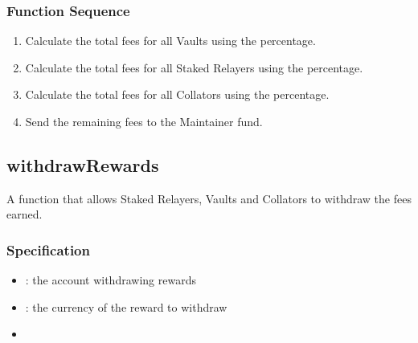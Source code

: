\documentclass[a4paper,10pt,english]{sphinxmanual}
\begin{document}


\subsubsection{Function Sequence}
\label{\detokenize{spec/fee:function-sequence}}\begin{enumerate}
%
\item {} 
Calculate the total fees for all Vaults using the  percentage.

\item {} 
Calculate the total fees for all Staked Relayers using the  percentage.

\item {} 
Calculate the total fees for all Collators using the  percentage.

\item {} 
Send the remaining fees to the Maintainer fund.

\end{enumerate}


\subsection{withdrawRewards}
\label{\detokenize{spec/fee:withdrawrewards}}\label{\detokenize{spec/fee:id5}}
A function that allows Staked Relayers, Vaults and Collators to withdraw the fees earned.


\subsubsection{Specification}
\label{\detokenize{spec/fee:id6}}


\begin{itemize}
\item {} 
: the account withdrawing rewards

\item {} 
: the currency of the reward to withdraw

\end{itemize}

\begin{itemize}
\item {} 

\end{itemize}
\end{document}
